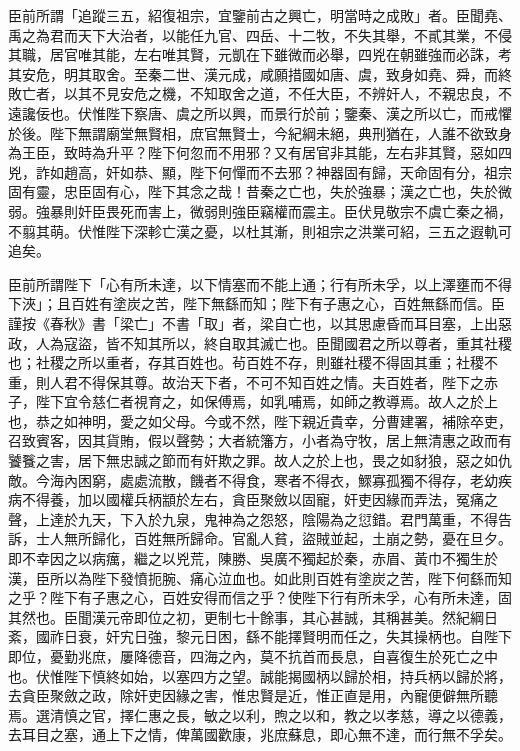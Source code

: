 \begin{pinyinscope}
 臣前所謂「追蹤三五，紹復祖宗，宜鑒前古之興亡，明當時之成敗」者。臣聞堯、禹之為君而天下大治者，以能任九官、四岳、十二牧，不失其舉，不貳其業，不侵其職，居官唯其能，左右唯其賢，元凱在下雖微而必舉，四兇在朝雖強而必誅，考其安危，明其取舍。至秦二世、漢元成，咸願措國如唐、虞，致身如堯、舜，而終敗亡者，以其不見安危之機，不知取舍之道，不任大臣，不辨奸人，不親忠良，不遠讒佞也。伏惟陛下察唐、虞之所以興，而景行於前；鑒秦、漢之所以亡，而戒懼於後。陛下無謂廟堂無賢相，庶官無賢士，今紀綱未絕，典刑猶在，人誰不欲致身為王臣，致時為升平？陛下何忽而不用邪？又有居官非其能，左右非其賢，惡如四兇，詐如趙高，奸如恭、顯，陛下何憚而不去邪？神器固有歸，天命固有分，祖宗固有靈，忠臣固有心，陛下其念之哉！昔秦之亡也，失於強暴；漢之亡也，失於微弱。強暴則奸臣畏死而害上，微弱則強臣竊權而震主。臣伏見敬宗不虞亡秦之禍，不翦其萌。伏惟陛下深軫亡漢之憂，以杜其漸，則祖宗之洪業可紹，三五之遐軌可追矣。



 臣前所謂陛下「心有所未達，以下情塞而不能上通；行有所未孚，以上澤壅而不得下浹」；且百姓有塗炭之苦，陛下無繇而知；陛下有子惠之心，百姓無繇而信。臣謹按《春秋》書「梁亡」不書「取」者，梁自亡也，以其思慮昏而耳目塞，上出惡政，人為寇盜，皆不知其所以，終自取其滅亡也。臣聞國君之所以尊者，重其社稷也；社稷之所以重者，存其百姓也。茍百姓不存，則雖社稷不得固其重；社稷不重，則人君不得保其尊。故治天下者，不可不知百姓之情。夫百姓者，陛下之赤子，陛下宜令慈仁者視育之，如保傅焉，如乳哺焉，如師之教導焉。故人之於上也，恭之如神明，愛之如父母。今或不然，陛下親近貴幸，分曹建署，補除卒吏，召致賓客，因其貨賄，假以聲勢；大者統籓方，小者為守牧，居上無清惠之政而有饕餮之害，居下無忠誠之節而有奸欺之罪。故人之於上也，畏之如豺狼，惡之如仇敵。今海內困窮，處處流散，饑者不得食，寒者不得衣，鰥寡孤獨不得存，老幼疾病不得養，加以國權兵柄顓於左右，貪臣聚斂以固寵，奸吏因緣而弄法，冤痛之聲，上達於九天，下入於九泉，鬼神為之怨怒，陰陽為之愆錯。君門萬重，不得告訴，士人無所歸化，百姓無所歸命。官亂人貧，盜賊並起，土崩之勢，憂在旦夕。即不幸因之以病癘，繼之以兇荒，陳勝、吳廣不獨起於秦，赤眉、黃巾不獨生於漢，臣所以為陛下發憤扼腕、痛心泣血也。如此則百姓有塗炭之苦，陛下何繇而知之乎？陛下有子惠之心，百姓安得而信之乎？使陛下行有所未孚，心有所未達，固其然也。臣聞漢元帝即位之初，更制七十餘事，其心甚誠，其稱甚美。然紀綱日紊，國祚日衰，奸宄日強，黎元日困，繇不能擇賢明而任之，失其操柄也。自陛下即位，憂勤兆庶，屢降德音，四海之內，莫不抗首而長息，自喜復生於死亡之中也。伏惟陛下慎終如始，以塞四方之望。誠能揭國柄以歸於相，持兵柄以歸於將，去貪臣聚斂之政，除奸吏因緣之害，惟忠賢是近，惟正直是用，內寵便僻無所聽焉。選清慎之官，擇仁惠之長，敏之以利，煦之以和，教之以孝慈，導之以德義，去耳目之塞，通上下之情，俾萬國歡康，兆庶蘇息，即心無不達，而行無不孚矣。




\end{pinyinscope}

